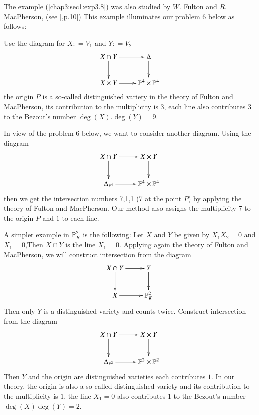 \setcounter{remark}{8}
\begin{remark}\label{chap3:sec1:rem3.9}
  The example (\ref{chap3:sec1:exp3.8}) was also studied by $W$. Fulton and $R$. MacPherson,
  (see [\cite{19},p.10]) This example illuminates our problem 6 below as
  follows: 
  
  Use the diagram for $X: = V_1$ and $Y: =V_2$
    \[
    \xymatrix{X \cap Y \ar[r]\ar[d]& \Delta \ar[d]\\
      X \times Y \ar[r] & \mathbb{P}^4 \times \mathbb{P}^4      
      }
    \]
  the origin $P$ is a so-called distinguished variety in the theory of
  Fulton and MacPherson, its contribution to the multiplicity is $3$,
  each line also contributes $3$ to the Bezout's number $\deg
  (X). \deg (Y) = 9 $. 
  
  In view of the problem $6$ below, we want to consider another
  diagram. Using the diagram 
  \[
  \xymatrix{X \cap Y \ar[r] \ar[d] & X \times Y \ar[d]\\
    \Delta_{\mathbb{P}^4} \ar[r] & \mathbb{P}^4 \times \mathbb{P}^4
    }
  \]  
  then we get the intersection numbers 7,1,1  (7 at the point $P$) by
  applying the theory of Fulton and MacPherson. Our method also\pageoriginale
  assigns the multiplicity $7$ to the origin $P$ and $1$ to each
  line. 
  
  A simpler example in $\mathbb{P}^2_K$ is the following: Let $X$ and
  $Y$ be given by $X_1 X_2 = 0$ and $X_1 = 0$,\resp  Then $X \cap Y$ is
  the line $X_1 = 0$. Applying again the theory of Fulton and
  MacPherson, we will construct intersection from the diagram   
  \[
  \xymatrix{X \cap Y \ar[r]\ar[d] & Y\ar[d]\\
    X \ar[r] & \mathbb{P}_K^2
    }
  \]
  Then only $Y$ is a distinguished variety and counts twice. Construct
  intersection from the diagram 
  \[
  \xymatrix{X \cap Y \ar[r]\ar[d] & X \times Y \ar[d]\\
    \Delta_{\mathbb{P}^2}\ar[r] & \mathbb{P}^2 \times \mathbb{P}^2
    }
  \]
  Then $Y$ and the origin are distinguished varieties each contributes
  $1$. In our theory, the origin is also a so-called distinguished
  variety and its contribution to the multiplicity is $1$, the line
  $X_1 = 0$ also contributes $1$ to the Bezout's number $\deg (X) \deg
  (Y) = 2$. 
\end{remark}

